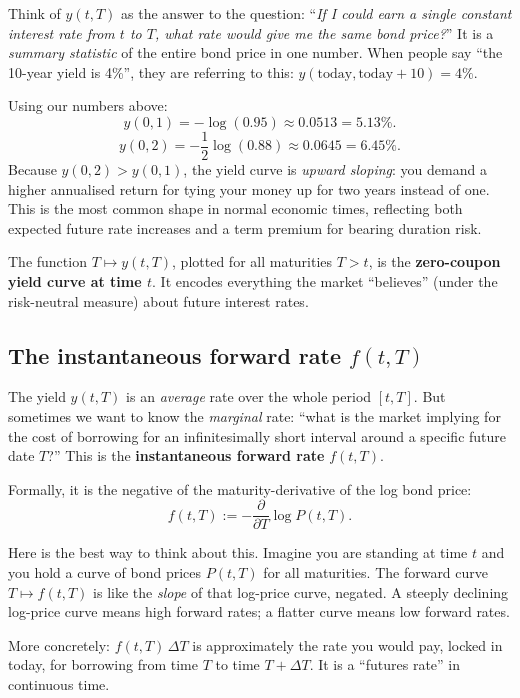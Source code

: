 \documentclass[11pt]{article}
\begin{document}
\begin{intuition}
Think of $y(t,T)$ as the answer to the question: ``\emph{If I could earn a
single constant interest rate from $t$ to $T$, what rate would give me the
same bond price?}''  It is a \emph{summary statistic} of the entire bond
price in one number.  When people say ``the 10-year yield is 4\%'', they
are referring to this: $y(\text{today}, \text{today}+10) = 4\%$.
\end{intuition}

\begin{example_box}
Using our numbers above:
\[
y(0,1) = -\log(0.95) \approx 0.0513 = 5.13\%.
\]
\[
y(0,2) = -\frac{1}{2}\log(0.88) \approx 0.0645 = 6.45\%.
\]
Because $y(0,2) > y(0,1)$, the yield curve is \emph{upward sloping}: you
demand a higher annualised return for tying your money up for two years
instead of one.  This is the most common shape in normal economic times,
reflecting both expected future rate increases and a term premium for
bearing duration risk.
\end{example_box}

The function $T \mapsto y(t,T)$, plotted for all maturities $T > t$, is the
\textbf{zero-coupon yield curve at time $t$}.  It encodes everything the
market ``believes'' (under the risk-neutral measure) about future interest
rates.

\subsection{The instantaneous forward rate $f(t,T)$}

The yield $y(t,T)$ is an \emph{average} rate over the whole period
$[t,T]$.  But sometimes we want to know the \emph{marginal} rate: ``what
is the market implying for the cost of borrowing for an infinitesimally
short interval around a specific future date $T$?''  This is the
\textbf{instantaneous forward rate} $f(t,T)$.

Formally, it is the negative of the maturity-derivative of the log bond
price:
\[
f(t,T) := -\frac{\partial}{\partial T} \log P(t,T).
\]

\begin{intuition}
Here is the best way to think about this.  Imagine you are standing at
time $t$ and you hold a curve of bond prices $P(t,T)$ for all maturities.
The forward curve $T \mapsto f(t,T)$ is like the \emph{slope} of that
log-price curve, negated.  A steeply declining log-price curve means
high forward rates; a flatter curve means low forward rates.

More concretely: $f(t,T)\,\Delta T$ is approximately the rate you would
pay, locked in today, for borrowing from time $T$ to time $T+\Delta T$.
It is a ``futures rate'' in continuous time.
\end{intuition}
\end{document}
